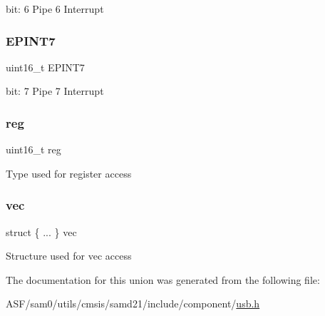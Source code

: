 bit\+: 6 Pipe 6 Interrupt \mbox{\label{union_u_s_b___h_o_s_t___p_i_n_t_s_m_r_y___type_acb2f7ac05b43be1a27ebe8e216356625}} 
\subsubsection{\texorpdfstring{EPINT7}{EPINT7}}
{\footnotesize\ttfamily uint16\+\_\+t E\+P\+I\+N\+T7}

bit\+: 7 Pipe 7 Interrupt \mbox{\label{union_u_s_b___h_o_s_t___p_i_n_t_s_m_r_y___type_a11760f5020019f4aa8cb02e694f7cc44}} 
\subsubsection{\texorpdfstring{reg}{reg}}
{\footnotesize\ttfamily uint16\+\_\+t reg}

Type used for register access \mbox{\label{union_u_s_b___h_o_s_t___p_i_n_t_s_m_r_y___type_a428522b272f72290913d99db1fdbbfd7}} 
\subsubsection{\texorpdfstring{vec}{vec}}
{\footnotesize\ttfamily struct \{ ... \}   vec}

Structure used for vec access 

The documentation for this union was generated from the following file\+:\begin{DoxyCompactItemize}
\item 
A\+S\+F/sam0/utils/cmsis/samd21/include/component/\mbox{\hyperlink{component_2usb_8h}{usb.\+h}}\end{DoxyCompactItemize}
